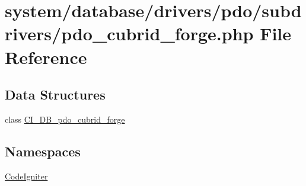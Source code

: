 \hypertarget{pdo__cubrid__forge_8php}{}\section{system/database/drivers/pdo/subdrivers/pdo\+\_\+cubrid\+\_\+forge.php File Reference}
\label{pdo__cubrid__forge_8php}
\subsection*{Data Structures}
\begin{DoxyCompactItemize}
\item 
class \mbox{\hyperlink{class_c_i___d_b__pdo__cubrid__forge}{C\+I\+\_\+\+D\+B\+\_\+pdo\+\_\+cubrid\+\_\+forge}}
\end{DoxyCompactItemize}
\subsection*{Namespaces}
\begin{DoxyCompactItemize}
\item 
 \mbox{\hyperlink{namespace_code_igniter}{Code\+Igniter}}
\end{DoxyCompactItemize}

